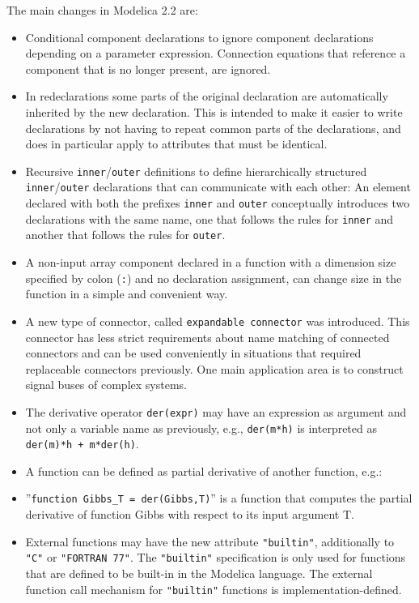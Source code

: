 The main changes in Modelica 2.2 are:
\begin{itemize}
\item
  Conditional component declarations to ignore component declarations
  depending on a parameter expression. Connection equations that
  reference a component that is no longer present, are ignored.
\item
  In redeclarations some parts of the original declaration are
  automatically inherited by the new declaration. This is intended to
  make it easier to write declarations by not having to repeat common
  parts of the declarations, and does in particular apply to attributes
  that must be identical.
\item
  Recursive \lstinline!inner!/\lstinline!outer! definitions to define hierarchically structured
  \lstinline!inner!/\lstinline!outer! declarations that can communicate with each other: An
  element declared with both the prefixes \lstinline!inner! and \lstinline!outer! conceptually
  introduces two declarations with the same name, one that follows the
  rules for \lstinline!inner! and another that follows the rules for \lstinline!outer!.
\item
  A non-input array component declared in a function with a dimension size specified by colon (\lstinline!:!) and no declaration assignment, can change size in the function in a simple and convenient way.
\item
  A new type of connector, called \lstinline!expandable connector! was
  introduced. This connector has less strict requirements about name
  matching of connected connectors and can be used conveniently in
  situations that required replaceable connectors previously. One main
  application area is to construct signal buses of complex systems.
\item
  The derivative operator \lstinline!der(expr)! may have an expression as argument
  and not only a variable name as previously, e.g., \lstinline!der(m*h)! is
  interpreted as \lstinline!der(m)*h + m*der(h)!.
\item
  A function can be defined as partial derivative of another function,
  e.g.:
\item
  ''\lstinline!function Gibbs_T = der(Gibbs,T)!'' is a function that computes the
  partial derivative of function Gibbs with respect to its input
  argument T.
\item
  External functions may have the new attribute \lstinline!"builtin"!, additionally to \lstinline!"C"! or \lstinline!"FORTRAN 77"!.  The \lstinline!"builtin"! specification is only used for functions that are defined to be built-in in the Modelica language.  The external function call mechanism for \lstinline!"builtin"! functions is implementation-defined.
\end{itemize}

